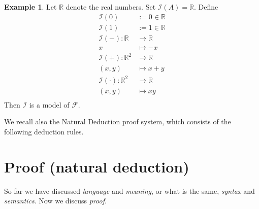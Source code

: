 \documentclass[12pt]{article}
\theoremstyle{plain}
\theoremstyle{definition}
\newtheorem{example}[thm]{Example}
\newcommand{\bb}[1]{\mathbb{#1}}
\newcommand{\call}[1]{\mathcal{#1}}
\newcommand{\lto}{\longrightarrow}
\begin{document}
\begin{example}
	Let $\bb{R}$ denote the real numbers. Set $\call{I}(A) = \bb{R}$. Define
	\begin{align*}
		\call{I}(0) &:= 0 \in \bb{R}\\
		\call{I}(1) &:= 1 \in \bb{R}\\
		\call{I}(-): \bb{R} &\lto \bb{R}\\
		x &\longmapsto -x\\
		\call{I}(+): \bb{R}^2 &\lto \bb{R}\\
		(x,y) &\longmapsto x + y\\
		\call{I}(\cdot): \bb{R}^2 &\lto \bb{R}\\
		(x,y) &\longmapsto xy\\
		\end{align*}
	Then $\call{I}$ is a model of $\call{F}$.
	\end{example}

We recall also the Natural Deduction proof system, which consists of the following deduction rules.

\section{Proof (natural deduction)}
So far we have discussed \emph{language} and \emph{meaning}, or what is the same, \emph{syntax} and \emph{semantics}. Now we discuss \emph{proof}.
\end{document}
